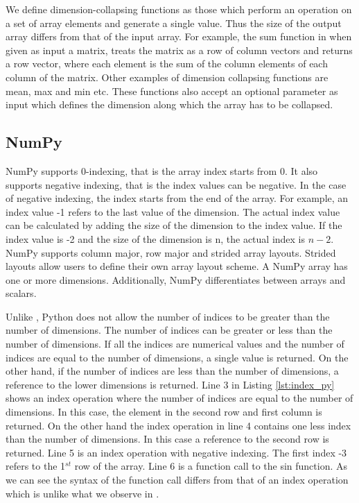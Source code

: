 We define dimension-collapsing functions as those which perform an operation on a set of array elements and generate a single value. Thus the size of the output array differs from that of the input array. For example, the \textsf{sum} function in \matlab when given as input a matrix, treats the matrix as a row of column vectors and returns a row vector, where each element is the sum of the column elements of each column of the matrix. Other examples of dimension collapsing functions are \textsf{mean}, \textsf{max} and \textsf{min} etc. These functions also accept an optional parameter as input which defines the dimension along which the array has to be collapsed. 
\subsection{NumPy}
NumPy supports 0-indexing, that is the array index starts from 0. It also supports negative indexing, that is the index values can be negative. In the case of negative indexing, the index starts from the end of the array. For example, an index value \textsf{-1} refers to the last value of the dimension. The actual index value can be calculated by adding the size of the dimension to the index value. If the index value is -2 and the size of the dimension is n, the actual index is $n - 2$. NumPy supports column major, row major and strided array layouts. Strided layouts allow users to define their own array layout scheme. A NumPy array has one or more dimensions. Additionally, NumPy differentiates between arrays and scalars.

Unlike \matlab, Python does not allow the number of indices to be greater than the number of dimensions. The number of indices can be greater or less than the number of dimensions. If all the indices are numerical values and the number of indices are equal to the number of dimensions, a single value is returned. On the other hand, if the number of indices are less than the number of dimensions, a reference to the lower dimensions is returned. Line 3 in Listing \ref{lst:index_py} shows an index operation where the number of indices are equal to the number of dimensions. In this case, the element in the second row and first column is returned. On the other hand the index operation in line 4 contains one less index than the number of dimensions. In this case a reference to the second row is returned. Line 5 is an index operation with negative indexing. The first index -3 refers to the 1$^{st}$ row of the array.  Line 6 is a function call to the sin function. As we can see the syntax of the function call differs from that of an index operation which is unlike what we observe in \matlab. 

